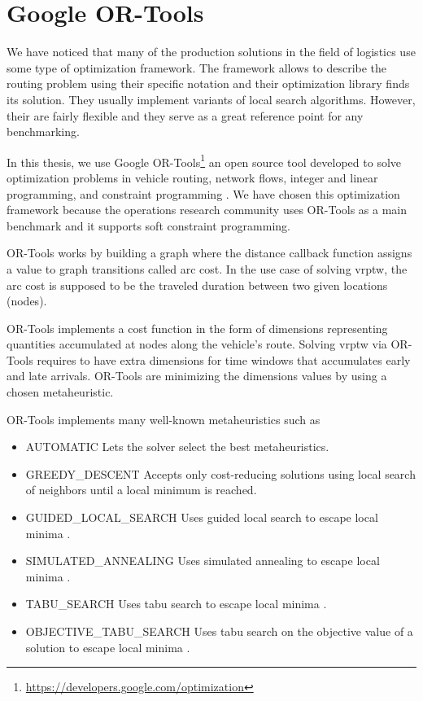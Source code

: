 \section{Google OR-Tools}
We have noticed that many of the production solutions in the field of logistics use some type of optimization framework. The framework allows to describe the routing problem using their specific notation and their optimization library finds its solution. They usually implement variants of local search algorithms. However, their are fairly flexible and they serve as a great reference point for any benchmarking.

In this thesis, we use Google OR-Tools\footnote{\url{https://developers.google.com/optimization}} an open source tool developed to solve optimization problems in vehicle routing, network flows, integer and linear programming, and constraint programming \cite{ortools}. We have chosen this optimization framework because the operations research community uses OR-Tools as a main benchmark and it supports soft constraint programming.

OR-Tools works by building a graph where the distance callback function assigns a value to graph transitions called arc cost. In the use case of solving \gls{vrptw}, the arc cost is supposed to be the traveled duration between two given locations (nodes). 

OR-Tools implements a cost function in the form of dimensions representing quantities accumulated at nodes along the vehicle's route. Solving \gls{vrptw} via OR-Tools requires to have extra dimensions for time windows that accumulates early and late arrivals. OR-Tools are minimizing the dimensions values by using a chosen metaheuristic. 

OR-Tools implements many well-known metaheuristics such as
\begin{itemize}
        \item AUTOMATIC Lets the solver select the best metaheuristics.
        \item GREEDY\_DESCENT Accepts only cost-reducing solutions using local search of neighbors until a local minimum is reached.
        \item GUIDED\_LOCAL\_SEARCH Uses guided local search to escape local minima \cite{guided-local-search}.
        \item SIMULATED\_ANNEALING Uses simulated annealing to escape local minima \cite{simulated-annealing}.
        \item TABU\_SEARCH Uses tabu search to escape local minima \cite{tabu-search}.
        \item OBJECTIVE\_TABU\_SEARCH Uses tabu search on the objective value of a solution to escape local minima \cite{objective-tabu-search}.
\end{itemize}

